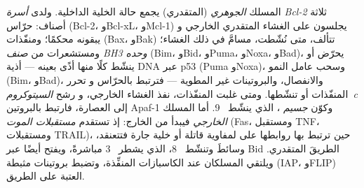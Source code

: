 \begin{definition}[المسلكان]\label{def:b3:cell-cycle-apoptosis:pathways}
المسلك \emph{الجوهري} (المتقدري) يجمع حالة الخلية
الداخلية. ولدى \emph{أسرة Bcl-2} ثلاثة أصناف: حرّاس
(Bcl-2، وBcl-xL، وMcl-1) يجلسون على الغشاء المتقدري الخارجي و
يبقونه محكمًا؛ ومنفّذات (Bax، وBak) تتألف، متى نُشّطت،
مسامَّ في ذلك الغشاء؛ ومستشعرات من \emph{صنف BH3 وحده} (Bim، وBid،
وPuma، وNoxa، وBad)، يحرّض أو ينشّط كلًا منها أذًى بعينه ---
أذية DNA عبر p53 (Puma وNoxa)، وسحب عامل النمو (Bim،
وBad)، والانفصال، والبروتينات غير المطوية --- فترتبط بالحرّاس و
تحرر المنفّذات أو تنشّطها. ومتى غلبت المنفّذات، نفذ الغشاء الخارجي، و
رشح \emph{السيتوكروم~c} إلى العصارة، فارتبط
بالبروتين Apaf-1 وكوّن \emph{جسيم }، الذي ينشّط ~9. أما
المسلك \emph{الخارجي} فيبدأ من الخارج: إذ تستقدم \emph{مستقبلات الموت} (Fas،
ومستقبل TNF، ومستقبلات TRAIL)، حين ترتبط بها روابطها على لمفاوية
قاتلة أو خلية جارة فتتعنقد، وسائطَ وتنشّط
~8، الذي يشطر ~3 مباشرةً، ويفتح أيضًا عبر Bid
الطريقَ المتقدري. ويلتقي المسلكان عند
الكاسبازات المنفِّذة، وتضبط بروتينات مثبطة (IAP، وFLIP)
العتبة على الطريق.
\end{definition}

